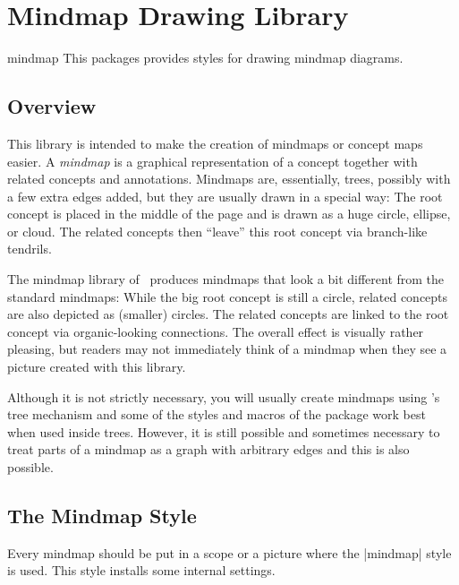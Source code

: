 %
%
%

\section{Mindmap Drawing Library}

\begin{tikzlibrary}{mindmap}
  This packages provides styles for drawing mindmap diagrams.
\end{tikzlibrary}

\subsection{Overview}

This library is intended to make the creation of mindmaps or concept
maps easier. A \emph{mindmap} is a graphical representation of a
concept together 
with related concepts and annotations. Mindmaps are, essentially,
trees, possibly with a few extra edges added, but they are usually
drawn in a special way: The root concept is placed in the middle of
the page and is drawn as a huge circle, ellipse, or cloud. The related
concepts then ``leave'' this root concept via branch-like tendrils.

The mindmap library of \tikzname\ produces mindmaps that look a bit
different from the standard mindmaps: While the big root concept is
still a circle, related concepts are also depicted as (smaller)
circles. The related concepts are linked to the root concept via
organic-looking connections. The overall effect is visually rather
pleasing, but readers may not immediately think of a mindmap when they
see a picture created with this library.

Although it is not strictly necessary, you will usually create
mindmaps using \tikzname's tree mechanism and some of the styles and
macros of the package work best when used inside trees. However, it is
still possible and sometimes necessary to treat parts of a mindmap as
a graph with arbitrary edges and this is also possible.


\subsection{The Mindmap Style}

Every mindmap should be put in a scope or a picture where the
|mindmap| style is used. This style installs some internal settings.

